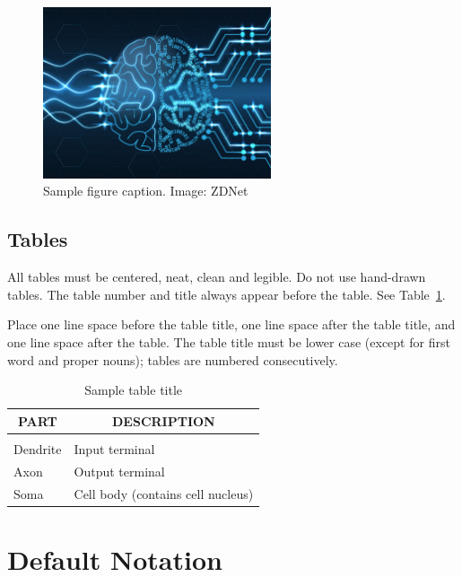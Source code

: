 \documentclass{article} %
\begin{document}
\begin{figure}[h]
\begin{center}
\includegraphics[width=0.6\textwidth]{Figs/td-deep-learning.jpg}
\end{center}
\caption{Sample figure caption. Image: ZDNet}
\end{figure}

\subsection{Tables}

All tables must be centered, neat, clean and legible. Do not use hand-drawn
tables. The table number and title always appear before the table. See
Table~\ref{sample-table}.

Place one line space before the table title, one line space after the table
title, and one line space after the table. The table title must be lower case
(except for first word and proper nouns); tables are numbered consecutively.

\begin{table}[t]
\caption{Sample table title}
\label{sample-table}
\begin{center}
\begin{tabular}{ll}
\multicolumn{1}{c}{\bf PART}  &\multicolumn{1}{c}{\bf DESCRIPTION}
\\ \hline \\
Dendrite         &Input terminal \\
Axon             &Output terminal \\
Soma             &Cell body (contains cell nucleus) \\
\end{tabular}
\end{center}
\end{table}

\section{Default Notation}
\end{document}
